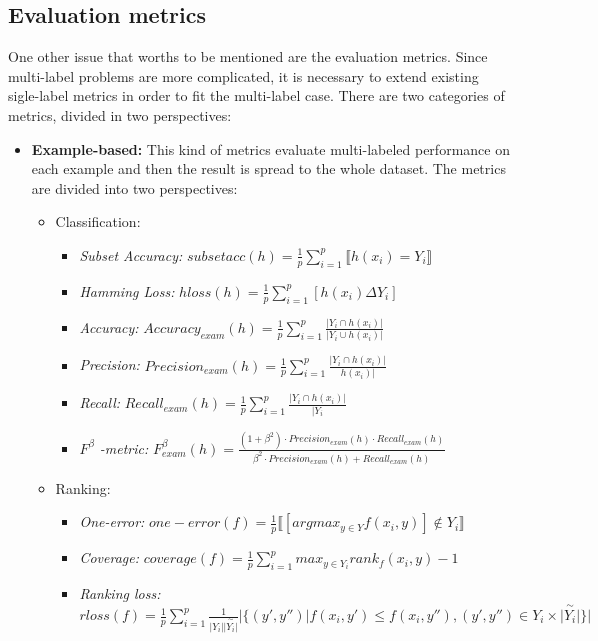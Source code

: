\documentclass[12pt]{report}
\begin{document}
	\subsection*{Evaluation metrics}
	One other issue that worths to be mentioned are the evaluation metrics. Since multi-label problems are more complicated, it is necessary to extend existing sigle-label metrics in order to fit the multi-label case. There are two categories of metrics, divided in two perspectives:
	\begin{itemize}
		\item \textbf{Example-based: }This kind of metrics evaluate multi-labeled performance on each example and then the result is spread to the whole dataset. The metrics are divided into two perspectives:
		\begin{itemize}
			\item Classification:
			\begin{itemize}
				\item \emph{Subset Accuracy: } $subsetacc(h) = \frac{1}{p} \sum_{i=1}^p \llbracket h(x_i) = Y_i \rrbracket$
				\item \emph{Hamming Loss: }$hloss(h) = \frac{1}{p} \sum_{i=1}^{p} [h(x_i)\Delta Y_i] $
				\item \emph{Accuracy:} $Accuracy_{exam}(h) = \frac{1}{p} \sum_{i=1}^{p} \frac{|Y_i \cap h(x_i)|}{|Y_i \cup h(x_i)|}$
				\item \emph{Precision: }$Precision_{exam}(h) = \frac{1}{p} \sum_{i=1}^{p} \frac{|Y_i \cap h(x_i)|}{h(x_i)|}$
				\item \emph{Recall: }$Recall_{exam}(h) = \frac{1}{p} \sum_{i=1}^{p} \frac{|Y_i \cap h(x_i)|}{|Y_i}$
				\item \emph{$F^ \beta$ -metric: } $F^ \beta _{exam} (h) = \frac{(1+ \beta ^2) \cdot Precision_{exam}(h) \cdot Recall_{exam}(h)}{\beta ^2 \cdot Precision_{exam}(h) + Recall_{exam}(h)}$
			\end{itemize}
			\item Ranking:
			\begin{itemize}
				\item \emph{One-error: }$one-error(f) = \frac{1}{p} \llbracket [argmax_{y \in Y}f(x_i,y)] \notin Y_i \rrbracket$
				\item \emph{Coverage: } $coverage(f) = \frac{1}{p} \sum_{i=1}^{p} max_{y \in Y_i} rank_f(x_i,y) - 1$
				\item \emph{Ranking loss: }$rloss(f) = \frac{1}{p} \sum_{i=1}^{p} \frac{1}{|Y_i| {\overset{\sim}{|Y_i|}}} |\{(y', y'') | f(x_i,y') \leq f(x_i,y''), (y', y'') \in Y_i \times {\overset{\sim}{|Y_i|}} \}| $ 

\end{itemize}
\end{itemize}
\end{itemize}
\end{document}
